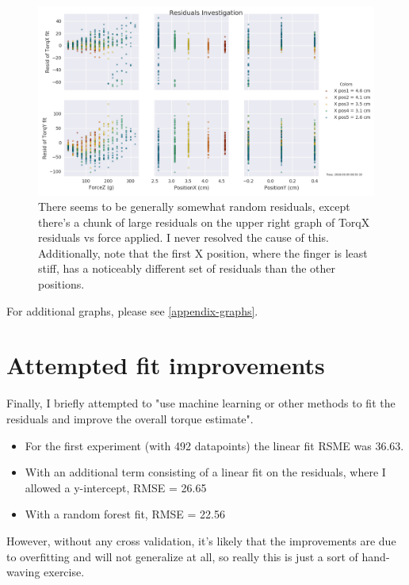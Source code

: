 \documentclass[preprint,12pt,3p]{elsarticle}
\begin{document}
\begin{figure}[tb!]
\centering
\includegraphics[width=1\textwidth]{images/round1/resids_Force_coloredX.png}
\caption{There seems to be generally somewhat random residuals, except there's a chunk of large
residuals on the upper right graph of TorqX residuals vs force applied. I never resolved the cause
of this. Additionally, note that the first X position, where the finger is least stiff, has a
noticeably different set of residuals than the other positions.}
\end{figure}

For additional graphs, please see \ref{appendix-graphs}.
\section{Attempted fit improvements}

Finally, I briefly attempted to "use machine learning or other methods to fit the residuals
and improve the overall torque estimate". 
\begin{itemize}
    \item For the first experiment (with 492 datapoints) the linear fit RSME was 36.63. 
\item With an additional term consisting of a linear fit on the residuals, where I allowed 
    a y-intercept, RMSE = 26.65
\item With a random forest fit, RMSE = 22.56
\end{itemize}

However, without any cross validation, it's likely that the improvements are due to overfitting and
will not generalize at all, so really this is just a sort of hand-waving exercise.
\end{document}
